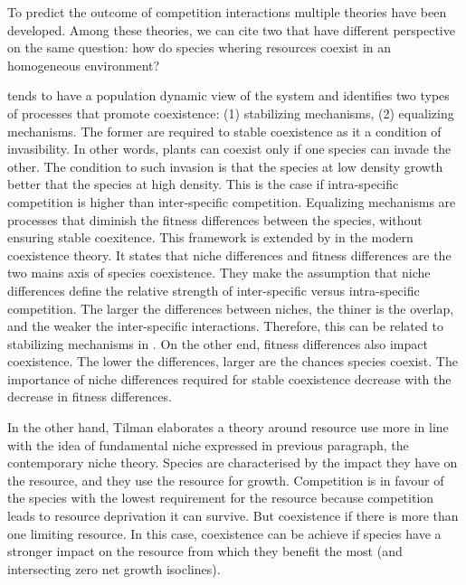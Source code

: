 To predict the outcome of competition interactions multiple theories have been developed. Among these theories, we can cite two that have different perspective on the same question: how do species whering resources coexist in an homogeneous environment?

\cite{chesson_mechanisms_2000} tends to have a population dynamic view of the system and identifies two types of processes that promote coexistence: (1) stabilizing mechanisms, (2) equalizing mechanisms. The former are required to stable coexistence as it a condition of invasibility. In other words, plants can coexist only if one species can invade the other. The condition to such invasion is that the species at low density growth better that the species at high density. This is the case if intra-specific competition is higher than inter-specific competition. Equalizing mechanisms are processes that diminish the fitness differences between the species, without ensuring stable coexitence. This framework is extended by \cite{adler_niche_2007} in the modern coexistence theory. It states that niche differences and fitness differences are the two mains axis of species coexistence. They make the assumption that niche differences define the relative strength of inter-specific versus intra-specific competition. The larger the differences between niches, the thiner is the overlap, and the weaker the inter-specific interactions. Therefore, this can be related to stabilizing mechanisms in \cite{chesson_general_2000}. On the other end, fitness differences also impact coexistence. The lower the differences, larger are the chances species coexist. The importance of niche differences required for stable coexistence decrease with the decrease in fitness differences.

In the other hand, Tilman elaborates a theory \cite{tilman_resource_1982, tilman_plant_1988} around resource use more in line with the idea of fundamental niche expressed in previous paragraph, the contemporary niche theory. Species are characterised by the impact they have on the resource, and they use the resource for growth. Competition is in favour of the species with the lowest requirement for the resource because competition leads to resource deprivation it can survive. But coexistence if there is more than one limiting resource. In this case, coexistence can be achieve if species have a stronger impact on the resource from which they benefit the most (and intersecting zero net growth isoclines). 


